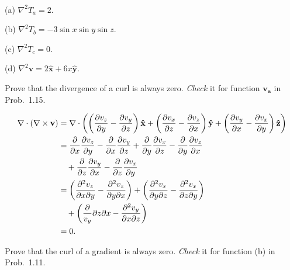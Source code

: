         \begin{sol}[1.26]~\\
            (a) $\nabla^2 T_a=2$.

            \noindent (b) $\nabla^2 T_b = -3\sin x \sin y\sin z$.

            \noindent (c) $\nabla^2 T_c = 0$.

            \noindent (d) $\nabla^2 \mathbf{v}=2\mathbf{\hat{x}} + 6x\mathbf{\hat{y}}$.
        \end{sol}

        \begin{prob}[1.27] Prove that the divergence of a curl is always zero. \textit{Check} it for function $\mathbf{v_a}$ in Prob.~1.15.
        \end{prob}

        \begin{sol}[1.27]
            \begin{equation}
                \begin{aligned}
                    \nabla\cdot(\nabla\times\mathbf{v}) &= \nabla\cdot\left(\left(\frac{\partial v_z}{\partial y} - \frac{\partial v_y}{\partial z}\right)\mathbf{\hat{x}} + \left(\frac{\partial v_x}{\partial z} - \frac{\partial v_z}{\partial x}\right)\mathbf{\hat{y}} + \left(\frac{\partial v_y}{\partial x} - \frac{\partial v_x}{\partial y}\right)\mathbf{\hat{z}}\right) \\
                    &=\frac{\partial }{\partial x}\frac{\partial v_z}{\partial y} - \frac{\partial }{\partial x}\frac{\partial v_y}{\partial z} + \frac{\partial }{\partial y}\frac{\partial v_x}{\partial z} - \frac{\partial }{\partial y}\frac{\partial v_z}{\partial x}\\ 
                    &\quad + \frac{\partial }{\partial z}\frac{\partial v_y}{\partial x} - \frac{\partial }{\partial z}\frac{\partial v_x}{\partial y} \\
                    &=\left(\frac{\partial^2v_z}{\partial x\partial y} -\frac{\partial^2v_z}{\partial y\partial x}\right) + \left(\frac{\partial^2v_x}{\partial y\partial z} - \frac{\partial^2v_x}{\partial z\partial y}\right) \\
                    &\quad + \left(\frac\partial{v_y}{\partial z\partial x} - \frac{\partial^2v_y}{\partial x\partial z}\right)\\
                    &=0.
                \end{aligned}
            \end{equation}
        \end{sol}

        \begin{prob}[1.28]Prove that the curl of a gradient is always zero. \textit{Check} it for function (b) in Prob.~1.11.
        \end{prob}


